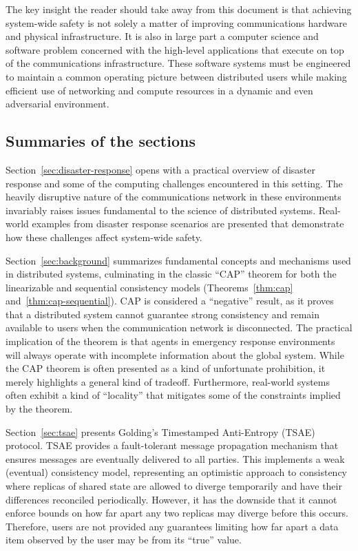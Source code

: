 \documentclass[]             %
{NASA}                       %
\theoremstyle{definition}
\begin{document}
The key insight the reader should take away from this document is that
achieving system-wide safety is not solely a matter of improving
communications hardware and physical infrastructure. It is also in
large part a computer science and software problem concerned with the
high-level applications that execute on top of the communications
infrastructure. These software systems must be engineered to maintain
a common operating picture between distributed users while making
efficient use of networking and compute resources in a dynamic and
even adversarial environment.

\subsection{Summaries of the sections}
\label{ssec:summaries-of-the-sections}
Section~\ref{sec:disaster-response} opens with a practical overview of
disaster response and some of the computing challenges encountered in
this setting. The heavily disruptive nature of the communications
network in these environments invariably raises issues fundamental to
the science of distributed systems. Real-world examples from disaster
response scenarios are presented that demonstrate how these challenges
affect system-wide safety.

Section~\ref{sec:background} summarizes fundamental concepts and
mechanisms used in distributed systems, culminating in the classic
``CAP'' theorem for both the linearizable and sequential consistency
models (Theorems~\ref{thm:cap} and~\ref{thm:cap-sequential}). CAP is
considered a ``negative'' result, as it proves that a distributed
system cannot guarantee strong consistency and remain available to
users when the communication network is disconnected. The practical
implication of the theorem is that agents in emergency response
environments will always operate with incomplete information about the
global system.  While the CAP theorem is often presented as a kind of
unfortunate prohibition, it merely highlights a general kind of
tradeoff. Furthermore, real-world systems often exhibit a kind of
``locality'' that mitigates some of the constraints implied by the
theorem.

Section~\ref{sec:tsae} presents Golding's Timestamped Anti-Entropy
(TSAE) protocol. TSAE provides a fault-tolerant message propagation
mechanism that ensures messages are eventually delivered to all
parties. This implements a weak (eventual) consistency model,
representing an optimistic approach to consistency where replicas of
shared state are allowed to diverge temporarily and have their
differences reconciled periodically. However, it has the downside that
it cannot enforce bounds on how far apart any two replicas may diverge
before this occurs. Therefore, users are not provided any guarantees
limiting how far apart a data item observed by the user may be from
its ``true'' value.
\end{document}
